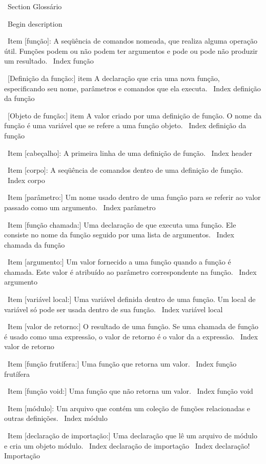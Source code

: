 \documentclass[10pt]{book}
\begin{document}
{\ Section {} Glossário

\ Begin {description}

\ Item [função]: A seqüência de comandos nomeada, que realiza alguma
operação útil. Funções podem ou não podem ter argumentos e pode ou
pode não produzir um resultado.
\ Index {função}

\ [Definição da função:] item A declaração que cria uma nova função,
especificando seu nome, parâmetros e comandos que ela executa.
\ Index {definição da função}

\ [Objeto de função:] item A valor criado por uma definição de função.
O nome da função é uma variável que se refere a uma função
objeto.
\ Index {definição da função}

\ Item [cabeçalho]: A primeira linha de uma definição de função.
\ Index {header}

\ Item [corpo]: A seqüência de comandos dentro de uma definição de função.
\ Index {corpo}

\ Item [parâmetro:] Um nome usado dentro de uma função para se referir ao valor
passado como um argumento.
\ Index {parâmetro}

\ Item [função chamada:] Uma declaração de que executa uma função. Ele
consiste no nome da função seguido por uma lista de argumentos.
\ Index {chamada da função}

\ Item [argumento:] Um valor fornecido a uma função quando a função é chamada.
Este valor é atribuído ao parâmetro correspondente na função.
\ Index {argumento}

\ Item [variável local:] Uma variável definida dentro de uma função. Um local de
variável só pode ser usada dentro de sua função.
\ Index {variável local}

\ Item [valor de retorno:] O resultado de uma função. Se uma chamada de função
é usado como uma expressão, o valor de retorno é o valor da
a expressão.
\ Index {valor de retorno}

\ Item [função frutífera:] Uma função que retorna um valor.
\ Index {função frutífera}

\ Item [função void:] Uma função que não retorna um valor.
\ Index {função void}

\ Item [módulo]: Um arquivo que contém um
coleção de funções relacionadas e outras definições.
\ Index {módulo}

\ Item [declaração de importação:] Uma declaração que lê um arquivo de módulo e cria
um objeto módulo.
\ Index {declaração de importação}
\ Index {declaração! Importação}

}
\end{document}
